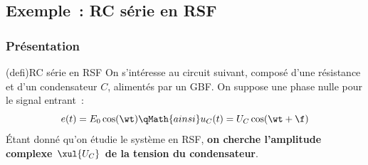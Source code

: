 \documentclass[../../main/main.tex]{subfiles}
\begin{document}
\subsection{Exemple~: RC série en RSF}
\subsubsection{Présentation}
\begin{tcb}[sidebyside, righthand ratio=.4](defi){RC série en RSF}
	On s'intéresse au circuit suivant, composé d'une résistance et d'un
	condensateur $C$, alimentés par un GBF. On suppose une phase nulle pour le
	signal entrant~:
	\[
		e(t) = E_0 \cos(\wt)
		\qMath{ainsi}
		u_C(t) = U_C \cos(\wt+\f)
	\]
	Étant donné qu'on étudie le système en RSF, \textbf{on cherche l'amplitude
		complexe $\xul{U_C}$ de la tension du condensateur}.
	\tcblower
	\begin{center}
	\end{center}
\end{tcb}
\end{document}
